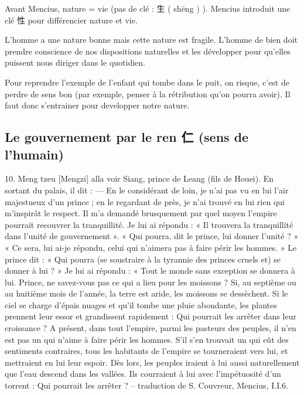 \begin{Def}[Xing 性 vs 生]
    Avant Mencius, nature = vie (pas de clé : 生 ( shēng ) ). Mencius introduit une clé  性 pour différencier nature et vie.
\end{Def}

\begin{Synthesis}
L'homme a une nature bonne mais cette nature est fragile.
L'homme de bien doit prendre conscience de nos dispositions naturelles et les développer pour qu'elles puissent nous diriger dans le quotidien.
\end{Synthesis}

\begin{Ex}
    Pour reprendre l'exemple de l'enfant qui tombe dans le puit, on risque, c'est de perdre de sens bon (par exemple, penser à la rétribution qu'on pourra avoir). Il faut donc s'entrainer pour developper notre nature.
\end{Ex}



 \subsection{Le gouvernement par le ren 仁 (sens de l’humain)}

\begin{singlequote}
10.	Meng tzeu [Mengzi] alla voir Siang, prince de Leang (fils de Houei). En sortant du palais, il dit :
—	En le considérant de loin, je n’ai pas vu en lui l’air majestueux d’un prince ; en le regardant de près, je n’ai trouvé en lui rien qui m’inspirât le respect. Il m’a demandé brusquement par quel moyen l’empire pourrait recouvrer la tranquillité. Je lui ai répondu : « Il trouvera la tranquillité dans l’unité de gouvernement ». « Qui pourra, dit le prince, lui donner l’unité ? » « Ce sera, lui ai-je répondu, celui qui n’aimera pas à faire périr les hommes. » Le prince dit : « Qui pourra (se soustraire à la tyrannie des princes cruels et) se donner à lui ? »
Je lui ai répondu : « Tout le monde sans exception se donnera à lui. Prince, ne savez-vous pas ce qui a lieu pour les moissons ? Si, au septième ou au huitième mois de l’année, la terre est aride, les moissons se dessèchent. Si le ciel se charge d’épais nuages et qu’il tombe une pluie abondante, les plantes prennent leur essor et grandissent rapidement : Qui pourrait les arrêter dans leur croissance ? A présent, dans tout l’empire, parmi les pasteurs des peuples, il n’en est pas un qui n’aime à faire périr les hommes. S’il s’en trouvait un qui eût des sentiments contraires, tous les habitants de l’empire se tourneraient vers lui, et mettraient en lui leur espoir. Dès lors, les peuples iraient à lui aussi naturellement que l’eau descend dans les vallées. Ils courraient à lui avec l’impétuosité d’un torrent : Qui pourrait les arrêter ?
-- traduction de S. Couvreur, Mencius, I.I.6.
    
\end{singlequote}


